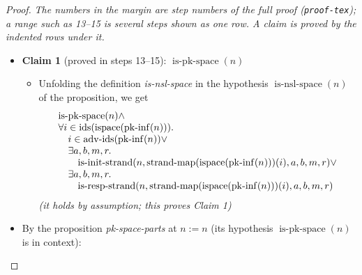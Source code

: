 \documentclass[11pt]{article}
\theoremstyle{plain}
\begin{document}
\begin{proof}
{\small\emph{The numbers in the margin are step numbers of the full proof (\texttt{proof-tex}); a range such as 13--15 is several steps shown as one row.  A claim is proved by the indented rows under it.}}\par\smallskip
\begin{itemize}[leftmargin=2.8em, itemsep=4pt, parsep=1pt]
  \item[\textbf{12}] \textbf{Claim 1} (proved in steps 13--15): $\operatorname{is\text{-}pk\text{-}space}(n)$
  \begin{itemize}[leftmargin=2.8em, itemsep=4pt, parsep=1pt]
  \item[\textbf{13--15}] Unfolding the definition \emph{is-nsl-space} in the hypothesis $\operatorname{is\text{-}nsl\text{-}space}(n)$ of the proposition, we get
\begin{equation*}
\begin{array}{@{}l@{}} \operatorname{is\text{-}pk\text{-}space}(n) \wedge \\ \forall i \in \operatorname{ids}(\operatorname{ispace}(\operatorname{pk\text{-}inf}(n))). \\ \quad i \in \operatorname{adv\text{-}ids}(\operatorname{pk\text{-}inf}(n)) \vee \\ \quad \exists a, b, m, r. \\ \quad \quad \operatorname{is\text{-}init\text{-}strand}(n, \operatorname{strand\text{-}map}(\operatorname{ispace}(\operatorname{pk\text{-}inf}(n)))(i), a, b, m, r) \vee \\ \quad \exists a, b, m, r. \\ \quad \quad \operatorname{is\text{-}resp\text{-}strand}(n, \operatorname{strand\text{-}map}(\operatorname{ispace}(\operatorname{pk\text{-}inf}(n)))(i), a, b, m, r) \end{array}
\end{equation*}
  \emph{(it holds by assumption; this proves Claim 1)}
  \end{itemize}
  \item[\textbf{16}] By the proposition \emph{pk-space-parts} at $n := n$ (its hypothesis $\operatorname{is\text{-}pk\text{-}space}(n)$ is in context):
\begin{equation*}

\end{equation*}
\end{itemize}
\end{proof}
\end{document}
